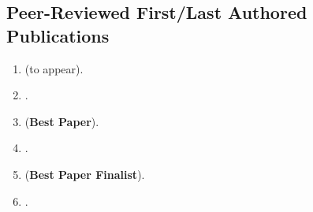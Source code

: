 \documentclass[margin,line]{res}
\begin{document}
\begin{resume}
%
%
\section{\sc Peer-Reviewed First/Last Authored Publications}
\begin{enumerate}
	\item {} (to appear).
	\item {}.
	\item {} (\textbf{Best Paper}).
	\item {}.
	\item {} (\textbf{Best Paper Finalist}).
	\item {}.


\end{enumerate}
\end{resume}
\end{document}
